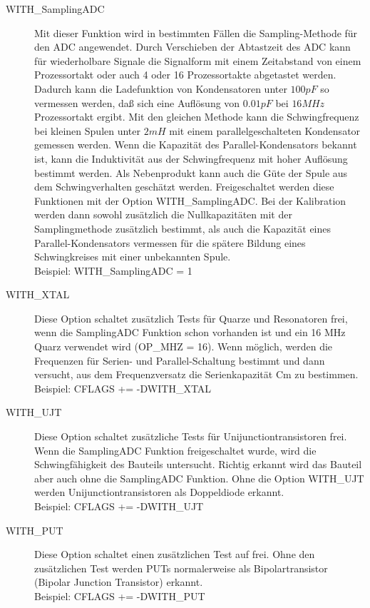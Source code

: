 \begin{description}
  \item[WITH\_SamplingADC] Mit dieser Funktion wird in bestimmten Fällen die Sampling-Methode für den ADC angewendet.
Durch Verschieben der Abtastzeit des ADC kann für wiederholbare Signale die Signalform mit einem Zeitabstand
von einem Prozessortakt oder auch 4 oder 16 Prozessortakte abgetastet werden. Dadurch kann die Ladefunktion von
Kondensatoren unter \(100pF\) so vermessen werden, daß sich eine Auflösung von \(0.01pF\) bei \(16MHz\) Prozessortakt ergibt.
Mit den gleichen Methode kann die Schwingfrequenz bei kleinen Spulen unter \(2mH\) mit einem parallelgeschalteten
Kondensator gemessen werden. Wenn die Kapazität des Parallel-Kondensators bekannt ist, kann die Induktivität aus
der Schwingfrequenz mit hoher Auflösung bestimmt werden. Als Nebenprodukt kann auch die Güte der Spule aus dem
Schwingverhalten geschätzt werden. Freigeschaltet werden diese Funktionen mit der Option WITH\_SamplingADC.
Bei der Kalibration werden dann sowohl zusätzlich die Nullkapazitäten mit der Samplingmethode zusätzlich bestimmt,
als auch die Kapazität eines Parallel-Kondensators vermessen für die spätere Bildung eines Schwingkreises mit einer unbekannten Spule.\\
Beispiel: WITH\_SamplingADC = 1

  \item[WITH\_XTAL]
Diese Option schaltet zusätzlich Tests für Quarze und Resonatoren frei, wenn die SamplingADC Funktion schon vorhanden ist
und ein 16 MHz Quarz verwendet wird (OP\_MHZ = 16).
Wenn möglich, werden die Frequenzen für Serien- und Parallel-Schaltung bestimmt und dann versucht,
aus dem Frequenzversatz die Serienkapazität Cm zu bestimmen.\\
Beispiel: CFLAGS += -DWITH\_XTAL

  \item[WITH\_UJT]
Diese Option schaltet zusätzliche Tests für Unijunctiontransistoren frei. 
Wenn die SamplingADC Funktion freigeschaltet wurde, wird die Schwingfähigkeit des Bauteils untersucht.
Richtig erkannt wird das Bauteil aber auch ohne die SamplingADC Funktion. 
Ohne die Option WITH\_UJT werden Unijunctiontransistoren als Doppeldiode erkannt.\\
Beispiel: CFLAGS += -DWITH\_UJT

  \item[WITH\_PUT]
  Diese Option schaltet einen zusätzlichen Test auf  frei.
Ohne den zusätzlichen Test werden PUTs normalerweise als Bipolartransistor (Bipolar Junction Transistor) erkannt.\\
Beispiel: CFLAGS += -DWITH\_PUT


\end{description}

